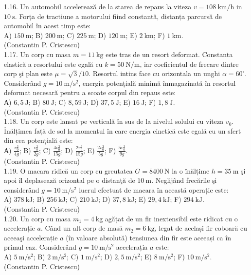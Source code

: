 1.16. Un automobil accelerează de la starea de repaus la viteza $v=108 \mathrm{~km} / \mathrm{h}$ in $10 \mathrm{~s}$. Forța de tractiune a motorului fiind constantă, distanța parcursă de automobil în acest timp este:\\ A) $150 \mathrm{~m}$; B) $200 \mathrm{~m}$; C) $225 \mathrm{~m}$; D) $120 \mathrm{~m}$; E) $2 \mathrm{~km}$; F) $1 \mathrm{~km}$.\\ (Constantin P. Cristescu)\\

1.17. Un corp cu masa $m=11 \mathrm{~kg}$ este tras de un resort deformat. Constanta elastică a resortului este egală cu $k=50 \mathrm{~N} / \mathrm{m}$, iar coeficientul de frecare dintre corp şi plan este $\mu=\sqrt{3} / 10$. Resortul intins face cu orizontala un unghi $\alpha=60^{\circ}$. Considerând $g=10 \mathrm{~m} / \mathrm{s}^{2}$, energia potențială minimă înmagazinată în resortul deformat necesară pentru a scoate corpul din repaus este:\\ А) $6,5 \mathrm{~J}$; B) $80 \mathrm{~J}$; C) $8,59 \mathrm{~J}$; D) $37,5 \mathrm{~J}$; E) $16 \mathrm{~J}$; F) $1,8 \mathrm{~J}$.\\ (Constantin P. Cristescu)\\

1.18. Un corp este lansat pe verticală în sus de la nivelul solului cu viteza $v_{0}$. Înălțimea față de sol la momentul în care energia cinetică este egală cu un sfert din cea potențială este:\\ А) $\frac{v_{0}^{2}}{4 g}$; B) $\frac{v_{0}^{2}}{2 g}$; C) $\frac{4 v_{0}^{2}}{15 g}$; D) $\frac{2 v_{0}^{2}}{15 g}$; E) $\frac{2 v_{0}^{2}}{5 g}$; F) $\frac{5 v_{0}^{2}}{9 g}$.\\ (Constantin P. Cristescu)\\

1.19. O macara ridică un corp cu greutatea $G=8400 \mathrm{~N}$ la o înălțime $h=35 \mathrm{~m}$ şi apoi îl deplasează orizontal pe o distanţă de $10 \mathrm{~m}$. Neglijând frecările şi considerând $g=10 \mathrm{~m} / \mathrm{s}^{2}$ lucrul efectuat de macara în această operație este:\\ A) $378 \mathrm{~kJ}$; B) $256 \mathrm{~kJ}$; C) $210 \mathrm{~kJ}$; D) $37,8 \mathrm{~kJ}$; E) $29,4 \mathrm{~kJ}$; F) $294 \mathrm{~kJ}$.\\ (Constantin P. Cristescu)\\

1.20. Un corp cu masa $m_{1}=4 \mathrm{~kg}$ agățat de un fir inextensibil este ridicat cu o accelerație $a$. Când un alt corp de masă $m_{2}=6 \mathrm{~kg}$, legat de același fir coboară cu aceeaşi accelerație $a$ (în valoare absolută) tensiunea din fir este aceeași ca în primul caz. Considerând $g=10 \mathrm{~m} / \mathrm{s}^{2}$ accelerația $a$ este:\\ A) $5 \mathrm{~m} / \mathrm{s}^{2}$; B) $2 \mathrm{~m} / \mathrm{s}^{2}$; C) $1 \mathrm{~m} / \mathrm{s}^{2}$; D) $2,5 \mathrm{~m} / \mathrm{s}^{2}$; E) $8 \mathrm{~m} / \mathrm{s}^{2}$; F) $10 \mathrm{~m} / \mathrm{s}^{2}$.\\ (Constantin P. Cristescu)\\

